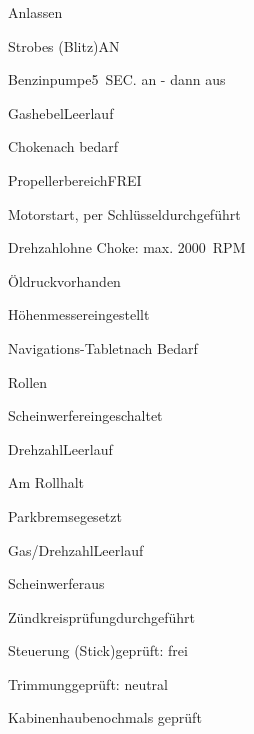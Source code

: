 \begin{checklist}{Anlassen}
	\item{Strobes (Blitz)}{AN}
	\item{Benzinpumpe}{5~SEC. an - dann aus}
	\item{Gashebel}{Leerlauf}
	\item{Choke}{nach bedarf}
	\item{Propellerbereich}{FREI}
	\item{Motorstart, per Schlüssel}{durchgeführt}
	\item{Drehzahl}{ohne Choke: max. 2000~RPM}
	\item{Öldruck}{vorhanden}
	\item{Höhenmesser}{eingestellt}
	\item{Navigations-Tablet}{nach Bedarf}
\end{checklist}

\begin{checklist}{Rollen}
	\item{Scheinwerfer}{eingeschaltet}
	\item{Drehzahl}{Leerlauf}
\end{checklist}

\begin{checklist}{Am Rollhalt}
	\item{Parkbremse}{gesetzt}
	\item{Gas/Drehzahl}{Leerlauf}
	\item{Scheinwerfer}{aus}
	\item{Zündkreisprüfung}{durchgeführt}
	\item{Steuerung (Stick)}{geprüft: frei}
	\item{Trimmung}{geprüft: neutral}
	\item{Kabinenhaube}{nochmals geprüft}
\end{checklist}

